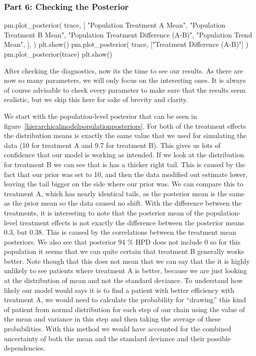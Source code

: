 \documentclass[12pt,a4paper,leqno]{report}
\theoremstyle{plain}
\theoremstyle{definition}
\theoremstyle{remark}
\begin{document}
\subsubsection*{Part 6: Checking the Posterior}

\bigskip
\begin{pyverbatim}[][fontsize=\footnotesize]
    pm.plot_posterior(
        trace,
        [
            "Population Treatment A Mean",
            "Population Treatment B Mean",
            "Population Treatment Difference (A-B)",
            "Population Trend Mean",
        ],
    )
    plt.show()
    pm.plot_posterior(
        trace, ["Treatment Difference (A-B)"]
    )
    pm.plot_posterior(trace)
    plt.show()
\end{pyverbatim}
\smallskip

After checking the diagnostics, now its the time to see our results. As there are
now so many parameters, we will only focus on the interesting ones. It is always of
course advisable to check every parameter to make sure that the results seem realistic,
but we skip this here for sake of brevity and clarity.

We start with the population-level posterior that can be seen in figure\
\ref{hierarchicalmodelpopulationposteriors}. For both of the treatment effects the
distribution means is exactly the same value that we used for simulating the data (10
for treatment A and 9.7 for treatment B). This gives us lots of confidence that our
model is working as intended. If we look at the distribution for treatment B we can see
that is has a thicker right tail. This is caused by the fact that our prior was set to
10, and then the data modified out estimate lower, leaving the tail bigger on the side
where our prior was. We can compare this to treatment A, which has nearly identical
tails, as the posterior mean is the same as the prior mean so the data caused no
shift. With the difference between the treatments, it is interesting to note that the
posterior mean of the population-level treatment effects is not exactly the difference
between the posterior means 0.3, but 0.38. This is caused by the correlations between
the treatment mean posteriors. We also see that posterior 94 \% HPD does not include 0
so for this population it seems that we can quite certain that treatment B
generally works better. Note though that this does not mean that we can say that the it is highly
unlikely to see patients where treatment A is better, because we are just looking at the
distribution of mean and not the standard deviance.
To understand how likely our model
would says it is to find a patient with better efficiency with treatment A, we would need
to calculate the probability for ``drawing'' this kind of patient from normal
distribution for each step of our chain using the value of the mean and variance in this
step and then taking the average of these probabilities. With this method we would have
accounted for the combined uncertainty of both the mean and the standard deviance and
their possible dependencies.
\end{document}
